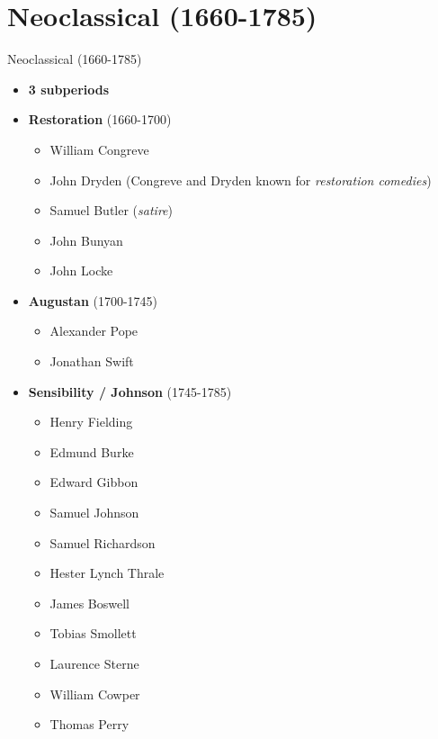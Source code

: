 \documentclass[
  12pt,
  ignorenonframetext,
  progressbar=frametitle]{beamer}
\providecommand{\tightlist}{%
  \setlength{\itemsep}{0pt}\setlength{\parskip}{0pt}}
\begin{document}
\section{Neoclassical (1660-1785)}
\begin{frame}[allowframebreaks]
{Neoclassical (1660-1785)}
\begin{itemize}
\tightlist
\item
  \textbf{3 subperiods}
\item
  \textbf{Restoration} (1660-1700)

  \begin{itemize}
  \tightlist
  \item
    William Congreve
  \item
    John Dryden (Congreve and Dryden known for \emph{restoration
    comedies})
  \item
    Samuel Butler (\emph{satire})
  \item
    John Bunyan
  \item
    John Locke
  \end{itemize}
\item
  \textbf{Augustan} (1700-1745)

  \begin{itemize}
  \tightlist
  \item
    Alexander Pope
  \item
    Jonathan Swift
  \end{itemize}
\item
  \textbf{Sensibility / Johnson} (1745-1785)

  \begin{itemize}
  \tightlist
  \item
    Henry Fielding
  \item
    Edmund Burke
  \item
    Edward Gibbon
  \item
    Samuel Johnson
  \item
    Samuel Richardson
  \item
    Hester Lynch Thrale
  \item
    James Boswell
  \item
    Tobias Smollett
  \item
    Laurence Sterne
  \item
    William Cowper
  \item
    Thomas Perry
  \end{itemize}
\end{itemize}
\end{frame}
\end{document}

